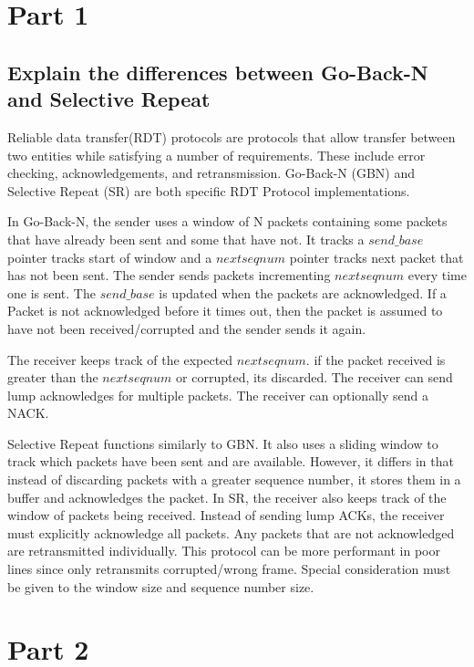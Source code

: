 \documentclass{assignment-x}
\begin{document}
\maketitle
\pagebreak


\section{Part 1}
\subsection{Explain the differences between Go-Back-N and Selective Repeat}
Reliable data transfer(RDT) protocols are protocols that allow transfer between two entities while satisfying a number of requirements. These include error checking, acknowledgements, and retransmission. Go-Back-N (GBN) and Selective Repeat (SR) are both specific RDT Protocol implementations. 

In Go-Back-N, the sender uses a window of N packets containing some packets that have already been sent and some that have not. It tracks a $send\_base$ pointer tracks start of window and a $nextseqnum$ pointer tracks next packet that has not been sent. The sender sends packets incrementing $nextseqnum$ every time one is sent. The $send\_base$ is updated when the packets are acknowledged.
If a Packet is not acknowledged before it times out, then the packet is assumed to have not been received/corrupted and the sender sends it again. 

The receiver keeps track of the expected $nextseqnum$. if the packet received is greater than the $nextseqnum$ or corrupted, its discarded. The receiver can send lump acknowledges for multiple packets. The receiver can optionally send a NACK.

Selective Repeat functions similarly to GBN. It also uses a sliding window to track which packets have been sent and are available. However, it differs in that instead of discarding packets with a greater sequence number, it stores them in a buffer and acknowledges the packet. In SR, the receiver also keeps track of the window of packets being received. Instead of sending lump ACKs, the receiver must explicitly acknowledge all packets. Any packets that are not acknowledged are retransmitted individually.  This protocol can be more performant in poor lines since only retransmits corrupted/wrong frame. Special consideration must be given to the window size and sequence number size.

\section{Part 2}
\end{document}
